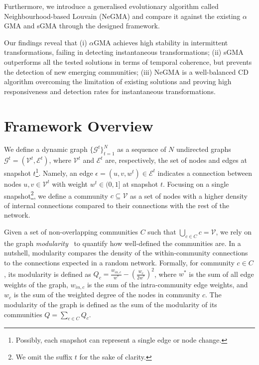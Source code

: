 \documentclass[letterpaper]{article}
\begin{document}
Furthermore, we introduce a generalised evolutionary algorithm called Neighbourhood-based Louvain (NeGMA) and compare it against the existing $\alpha$GMA and sGMA through the designed framework.

Our findings reveal that (i) $\alpha$GMA achieves high stability in intermittent transformations, failing in detecting instantaneous transformations; (ii) sGMA outperforms all the tested solutions in terms of temporal coherence, but prevents the detection of new emerging communities; (iii) NeGMA is a well-balanced CD algorithm overcoming the limitation of existing solutions and proving high responsiveness and detection rates for instantaneous transformations.

\section{Framework Overview}
\label{s:framework}

We define a dynamic graph $\{ \mathcal{G}^t \}_{t=1}^N$ as a sequence of $N$ undirected graphs $\mathcal{G}^t=(\mathcal{V}^t,\mathcal{E}^t)$, where $\mathcal{V}^t$ and $\mathcal{E}^t$ are, respectively, the set of nodes and edges at snapshot $t$\footnote{Possibly, each snapshot can represent a single edge or node change.}. 
Namely, an edge $\epsilon = (u,v,w^t)\in \mathcal{E}^t$ indicates a connection between nodes $u,v \in \mathcal{V}^t$ with weight $w^t \in \mathbb (0,1]$ at snapshot $t$.
Focusing on a single snapshot\footnote{We omit the suffix $t$ for the sake of clarity.}, we define a community $c \subseteq \mathcal{V}$ as a set of nodes with a higher density of internal connections compared to their connections with the rest of the network. 

Given a set of non-overlapping communities $C$ such that $\bigcup_{c \in C} c = \mathcal{V}$, we rely on the graph \emph{modularity}~\cite{newman2006modularity} to quantify how well-defined the communities are. In a nutshell, modularity compares the density of the within-community connections to the connections expected in a random network.
Formally, for community $c\in C$, its modularity is defined as $Q_c = \frac{w_{in, c}}{w^*} - \left(\frac{w_c}{2w^*}\right)^2$, where $w^*$ is the sum of all edge weights of the graph, $w_{in, c}$ is the sum of the intra-community edge weights, and $w_c$ is the sum of the weighted degree of the nodes in community $c$. The modularity of the graph is defined as the sum of the modularity of its communities $Q = \sum_{c \in C} Q_c$.
\end{document}
